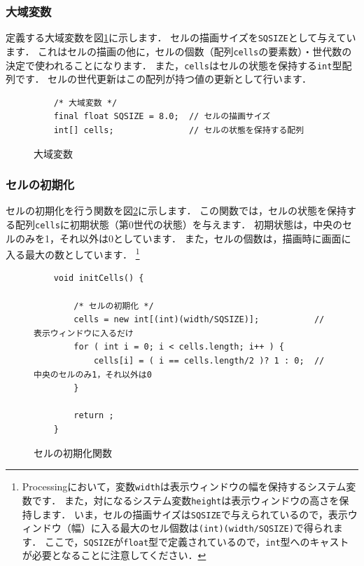 \documentclass[dvipdfmx]{jsarticle}
\theoremstyle{definition}
\begin{document}
\subsubsection{大域変数}

定義する大域変数を図\ref{code_globalvar}に示します．
セルの描画サイズを\verb|SQSIZE|として与えています．
これはセルの描画の他に，セルの個数（配列\verb|cells|の要素数）・世代数の決定で使われることになります．
また，\verb|cells|はセルの状態を保持する\verb|int|型配列です．
セルの世代更新はこの配列が持つ値の更新として行います．

\begin{figure}[ht]
\begin{center}
\begin{oframed}
\footnotesize
\begin{verbatim}
    /* 大域変数 */
    final float SQSIZE = 8.0;  // セルの描画サイズ
    int[] cells;               // セルの状態を保持する配列
\end{verbatim}
\end{oframed}
\end{center}
\caption{大域変数}
\label{code_globalvar}
\end{figure}


\subsubsection{セルの初期化}

セルの初期化を行う関数を図\ref{code_cellinit}に示します．
この関数では，セルの状態を保持する配列\verb|cells|に初期状態（第0世代の状態）を与えます．
初期状態は，中央のセルのみを1，それ以外は0としています．
また，セルの個数は，描画時に画面に入る最大の数としています．
\footnote{
    \label{fnote_display_window}
    Processingにおいて，変数\texttt{width}は表示ウィンドウの幅を保持するシステム変数です．
    また，対になるシステム変数\texttt{height}は表示ウィンドウの高さを保持します．
    いま，セルの描画サイズは\texttt{SQSIZE}で与えられているので，表示ウィンドウ（幅）に入る最大のセル個数は\texttt{(int)(width/SQSIZE)}で得られます．
    ここで，\texttt{SQSIZE}が\texttt{float}型で定義されているので，\texttt{int}型へのキャストが必要となることに注意してください．
}

\begin{figure}[ht]
\begin{center}
\begin{oframed}
\footnotesize
\begin{verbatim}
    void initCells() {

        /* セルの初期化 */
        cells = new int[(int)(width/SQSIZE)];           // 表示ウィンドウに入るだけ
        for ( int i = 0; i < cells.length; i++ ) {
            cells[i] = ( i == cells.length/2 )? 1 : 0;  // 中央のセルのみ1，それ以外は0
        }

        return ;
    }
\end{verbatim}
\end{oframed}
\end{center}
\caption{セルの初期化関数}
\label{code_cellinit}
\end{figure}
\end{document}
